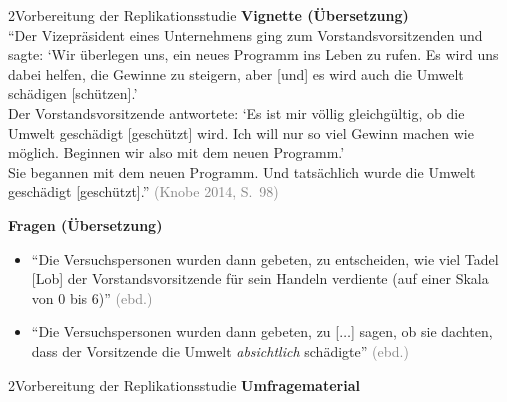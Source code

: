 \documentclass[xcolor=table,9pt,aspectratio=169]{beamer}
\begin{document}
\begin{frame}{\vspace*{10mm}2\hspace*{1em}Vorbereitung der Replikationsstudie}
\textbf{Vignette (Übersetzung)}\\
\smallskip
\enquote{Der Vizepräsident eines Unternehmens ging zum Vorstandsvorsitzenden und sagte: \enquote{Wir überlegen uns, ein neues Programm ins Leben zu rufen. Es wird uns dabei helfen, die Gewinne zu steigern, aber \textcolor{blue2}{[und]} es wird auch die Umwelt schädigen \textcolor{blue2}{[schützen]}.}\\\vspace{0.25em}
Der Vorstandsvorsitzende antwortete: \enquote{Es ist mir völlig gleichgültig, ob die Umwelt geschädigt \textcolor{blue2}{[geschützt]} wird. Ich will nur so viel Gewinn machen wie möglich. Beginnen wir also mit dem neuen Programm.}\\\vspace{0.25em}
Sie begannen mit dem neuen Programm. Und tatsächlich wurde die Umwelt geschädigt \textcolor{blue2}{[geschützt]}.} \textcolor{gray}{(Knobe 2014, S.~98)}

\bigskip
\textbf{Fragen (Übersetzung)}\\
\begin{itemize}
   \item \enquote{Die Versuchspersonen wurden dann gebeten, zu entscheiden, wie viel Tadel \textcolor{blue2}{[Lob]} der Vorstandsvorsitzende für sein Handeln verdiente (auf einer Skala von 0 bis 6)} \textcolor{gray}{(ebd.)}
   \item \enquote{Die Versuchspersonen wurden dann gebeten, zu [$\ldots$] sagen, ob sie dachten, dass der Vorsitzende die Umwelt \textit{absichtlich} schädigte} \textcolor{gray}{(ebd.)}
\end{itemize}
\end{frame}


\begin{frame}{\vspace*{10mm}2\hspace*{1em}Vorbereitung der Replikationsstudie}
\textbf{Umfragematerial}\\
\begin{center}
   \\
\end{center}
\end{frame}
\end{document}
